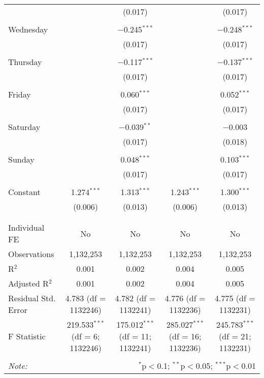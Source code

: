 \documentclass[
]{article}
\begin{document}
\begin{table}[!htbp]
{\begin{tabular}{@{\extracolsep{5pt}}lcccc}
  &  & (0.017) &  & (0.017) \\ 
  & & & & \\ 
 Wednesday &  & $-$0.245$^{***}$ &  & $-$0.248$^{***}$ \\ 
  &  & (0.017) &  & (0.017) \\ 
  & & & & \\ 
 Thursday &  & $-$0.117$^{***}$ &  & $-$0.137$^{***}$ \\ 
  &  & (0.017) &  & (0.017) \\ 
  & & & & \\ 
 Friday &  & 0.060$^{***}$ &  & 0.052$^{***}$ \\ 
  &  & (0.017) &  & (0.017) \\ 
  & & & & \\ 
 Saturday &  & $-$0.039$^{**}$ &  & $-$0.003 \\ 
  &  & (0.017) &  & (0.018) \\ 
  & & & & \\ 
 Sunday &  & 0.048$^{***}$ &  & 0.103$^{***}$ \\ 
  &  & (0.017) &  & (0.017) \\ 
  & & & & \\ 
 Constant & 1.274$^{***}$ & 1.313$^{***}$ & 1.243$^{***}$ & 1.300$^{***}$ \\ 
  & (0.006) & (0.013) & (0.006) & (0.013) \\ 
  & & & & \\ 
\hline \\[-1.8ex] 
Individual FE & No & No & No & No \\ 
Observations & 1,132,253 & 1,132,253 & 1,132,253 & 1,132,253 \\ 
R$^{2}$ & 0.001 & 0.002 & 0.004 & 0.005 \\ 
Adjusted R$^{2}$ & 0.001 & 0.002 & 0.004 & 0.005 \\ 
Residual Std. Error & 4.783 (df = 1132246) & 4.782 (df = 1132241) & 4.776 (df = 1132236) & 4.775 (df = 1132231) \\ 
F Statistic & 219.533$^{***}$ (df = 6; 1132246) & 175.012$^{***}$ (df = 11; 1132241) & 285.027$^{***}$ (df = 16; 1132236) & 245.783$^{***}$ (df = 21; 1132231) \\ 
\hline 
\hline \\[-1.8ex] 
\textit{Note:}  & \multicolumn{4}{r}{$^{*}$p$<$0.1; $^{**}$p$<$0.05; $^{***}$p$<$0.01} \\ 
\end{tabular}
} 
\end{table} 
\newpage
\end{document}
